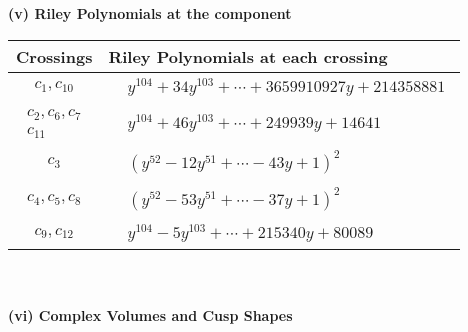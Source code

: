 \documentclass[1p]{elsarticle_modified}
\theoremstyle{definition}
\begin{document}
\newpage\renewcommand{\arraystretch}{1}
\flushleft \textbf{(v) Riley Polynomials at the component}\newline \\
\begin{tabular}{m{50pt}|m{274pt}}
Crossings & \hspace{64pt}Riley Polynomials at each crossing \\
\hline $$\begin{aligned}c_{1},c_{10}\end{aligned}$$&$\begin{aligned}
&y^{104}+34 y^{103}+\cdots+3659910927 y+214358881
\end{aligned}$\\
\hline $$\begin{aligned}c_{2},c_{6},c_{7}\\c_{11}\end{aligned}$$&$\begin{aligned}
&y^{104}+46 y^{103}+\cdots+249939 y+14641
\end{aligned}$\\
\hline $$\begin{aligned}c_{3}\end{aligned}$$&$\begin{aligned}
&(y^{52}-12 y^{51}+\cdots-43 y+1)^{2}
\end{aligned}$\\
\hline $$\begin{aligned}c_{4},c_{5},c_{8}\end{aligned}$$&$\begin{aligned}
&(y^{52}-53 y^{51}+\cdots-37 y+1)^{2}
\end{aligned}$\\
\hline $$\begin{aligned}c_{9},c_{12}\end{aligned}$$&$\begin{aligned}
&y^{104}-5 y^{103}+\cdots+215340 y+80089
\end{aligned}$\\
\hline
\end{tabular}\\~\\
\newpage\flushleft \textbf{(vi) Complex Volumes and Cusp Shapes}
\end{document}

